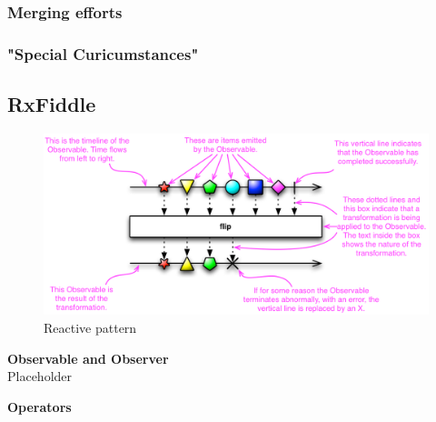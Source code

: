 	\subsubsection{Merging efforts}
	\subsubsection{"Special Curicumstances"}
	

\subsection{RxFiddle}



\begin{figure}[!h]
	\centering
	\includegraphics[scale=0.5,trim=0 0 0 0]{gfx/rxjs-reactive-pattern2.png}
	\caption{Reactive pattern \protect\cite{ReactiveXobservable}}
	\label{fig:rxjs-reactive-pattern}
\end{figure}

\textbf{Observable and Observer}\\
Placeholder

\textbf{Operators}
\label{subsec:Operators}\\

